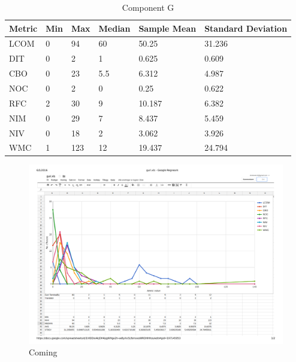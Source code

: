 \begin{table}[]
\centering
\caption{Component G}
\label{tab:oometrics-guri}
\begin{tabular}{|l|l|l|l|l|l|}
\hline
\textbf{Metric} & \textbf{Min} & \textbf{Max} & \textbf{Median} & \textbf{Sample Mean} & \textbf{Standard Deviation} \\ \hline
LCOM            & 0            & 94           & 60              & 50.25                & 31.236                      \\ \hline
DIT             & 0            & 2            & 1               & 0.625                & 0.609                       \\ \hline
CBO             & 0            & 23           & 5.5             & 6.312                & 4.987                       \\ \hline
NOC             & 0            & 2            & 0               & 0.25                 & 0.622                       \\ \hline
RFC             & 2            & 30           & 9               & 10.187               & 6.382                       \\ \hline
NIM             & 0            & 29           & 7               & 8.437                & 5.459                       \\ \hline
NIV             & 0            & 18           & 2               & 3.062                & 3.926                       \\ \hline
WMC            & 1            & 123          & 12              & 19.437                 & 24.794                      \\ \hline
\end{tabular}
\end{table}

\begin{landscape}
\setlength\LTleft{-.5in}
	\begin{figure}
	\centering
	\includegraphics[width=\textwidth]{images/pdf/guri.pdf}
	\caption{Coming}
	\label{fig:gurigraph}
	\end{figure}
\end{landscape}





